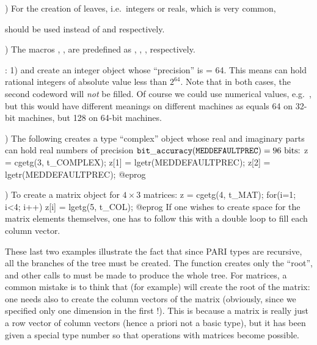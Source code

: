 ) For the creation of leaves, i.e.~integers or reals, which is
very common,



\noindent should be used instead of  and
 respectively.

) The macros , ,  are
predefined as , , ,
respectively.

: 1)  and
 create an integer object whose ``precision''
is  = 64. This means  can hold rational
integers of absolute value less than $2^{64}$. Note that in both cases, the
second codeword will {\it not\/} be filled. Of course we could use numerical
values, e.g.~, but this would have different meanings on
different machines as  equals 64 on 32-bit machines,
but 128 on 64-bit machines.

) The following creates a type ``complex'' object whose real and
imaginary parts can hold real numbers of precision
${\tt bit\_accuracy(MEDDEFAULTPREC)} = 96\hbox{ bits:}$
%
\bprog
  z = cgetg(3, t_COMPLEX);
  z[1] = lgetr(MEDDEFAULTPREC);
  z[2] = lgetr(MEDDEFAULTPREC);
@eprog

) To create a matrix object for $4\times 3$ matrices:
%
\bprog
  z = cgetg(4, t_MAT);
  for(i=1; i<4; i++) z[i] = lgetg(5, t_COL);
@eprog
%
\noindent If one wishes to create space for the matrix elements themselves,
one has to follow this with a double loop to fill each column vector.

These last two examples illustrate the fact that since PARI types are
recursive, all the branches of the tree must be created. The function
 creates only the ``root'', and other calls to  must be
made to produce the whole tree.  For matrices, a common mistake is to think
that  (for example) will create the root of the
matrix: one needs also to create the column vectors of the matrix (obviously,
since we specified only one dimension in the first !). This is
because a matrix is really just a row vector of column vectors (hence a
priori not a basic type), but it has been given a special type number so that
operations with matrices become possible.

